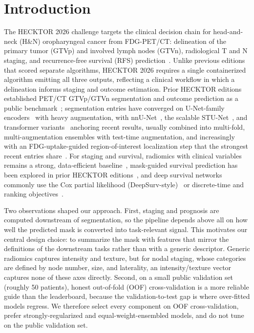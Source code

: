\documentclass[runningheads]{llncs}
\begin{document}
\section{Introduction}

The HECKTOR 2026 challenge targets the clinical decision chain for head-and-neck (H\&N) oropharyngeal cancer from FDG-PET/CT: delineation of the primary tumor (GTVp) and involved lymph nodes (GTVn), radiological T and N staging, and recurrence-free survival (RFS) prediction~\cite{ref1,ref2}. Unlike previous editions that scored separate algorithms, HECKTOR 2026 requires a single containerized algorithm emitting all three outputs, reflecting a clinical workflow in which a delineation informs staging and outcome estimation. Prior HECKTOR editions established PET/CT GTVp/GTVn segmentation and outcome prediction as a public benchmark~\cite{ref1,ref2,ref3}; segmentation entries have converged on U-Net-family encoders~\cite{ref4} with heavy augmentation, with nnU-Net~\cite{ref5}, the scalable STU-Net~\cite{ref6}, and transformer variants~\cite{ref7} anchoring recent results, usually combined into multi-fold, multi-augmentation ensembles with test-time augmentation, and increasingly with an FDG-uptake-guided region-of-interest localization step that the strongest recent entries share~\cite{ref2}. For staging and survival, radiomics with clinical variables remains a strong, data-efficient baseline~\cite{ref8,ref9}, mask-guided survival prediction has been explored in prior HECKTOR editions~\cite{ref10}, and deep survival networks commonly use the Cox partial likelihood (DeepSurv-style)~\cite{ref11,ref12} or discrete-time and ranking objectives~\cite{ref13}.

Two observations shaped our approach. First, staging and prognosis are computed downstream of segmentation, so the pipeline depends above all on how well the predicted mask is converted into task-relevant signal. This motivates our central design choice: to summarize the mask with features that mirror the definitions of the downstream tasks rather than with a generic descriptor. Generic radiomics captures intensity and texture, but for nodal staging, whose categories are defined by node number, size, and laterality, an intensity/texture vector captures none of these axes directly. Second, on a small public validation set (roughly 50 patients), honest out-of-fold (OOF) cross-validation is a more reliable guide than the leaderboard, because the validation-to-test gap is where over-fitted models regress. We therefore select every component on OOF cross-validation, prefer strongly-regularized and equal-weight-ensembled models, and do not tune on the public validation set.
\end{document}
